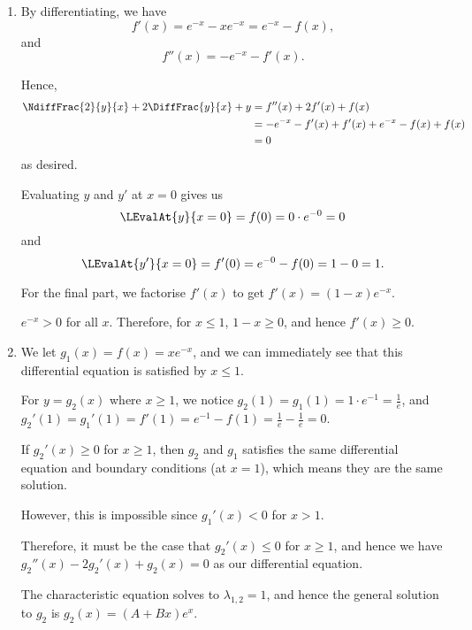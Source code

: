 \Question{\currfilebase}

\begin{enumerate}
    \item By differentiating, we have
          \[
              f'(x) = e^{-x} - x e^{-x} = e^{-x} - f(x),
          \]
          and
          \[
              f''(x) = -e^{-x} - f'(x).
          \]

          Hence,
          \begin{align*}
              \NdiffFrac{2}{y}{x} + 2 \DiffFrac{y}{x} + y & = f''(x) + 2f'(x) + f(x)                         \\
                                                          & = -e^{-x} - f'(x) + f'(x) + e^{-x} - f(x) + f(x) \\
                                                          & = 0
          \end{align*}
          as desired.

          Evaluating \(y\) and \(y'\) at \(x = 0\) gives us
          \[
              \LEvalAt{y}{x = 0} = f(0) = 0 \cdot e^{-0} = 0
          \]
          and
          \[
              \LEvalAt{y'}{x = 0} = f'(0) = e^{-0} - f(0) = 1 - 0 = 1.
          \]

          For the final part, we factorise \(f'(x)\) to get \(f'(x) = (1 - x) e^{-x}\).

          \(e^{-x} > 0\) for all \(x\). Therefore, for \(x \leq 1\), \(1 - x \geq 0\), and hence \(f'(x) \geq 0\).

    \item We let \(g_1(x) = f(x) = x e^{-x}\), and we can immediately see that this differential equation is satisfied by \(x \leq 1\).

          For \(y = g_2(x)\) where \(x \geq 1\), we notice \(g_2(1) = g_1(1) = 1 \cdot e^{-1} = \frac{1}{e}\), and \(g_2'(1) = g_1'(1) = f'(1) = e^{-1} - f(1) = \frac{1}{e} - \frac{1}{e} = 0\).

          If \(g_2'(x) \geq 0\) for \(x \geq 1\), then \(g_2\) and \(g_1\) satisfies the same differential equation and boundary conditions (at \(x = 1\)), which means they are the same solution.

          However, this is impossible since \(g_1'(x) < 0\) for \(x > 1\).

          Therefore, it must be the case that \(g_2'(x) \leq 0\) for \(x \geq 1\), and hence we have \(g_2''(x) - 2 g_2'(x) + g_2(x) = 0\) as our differential equation.

          The characteristic equation solves to \(\lambda_{1, 2} = 1\), and hence the general solution to \(g_2\) is \(g_2(x) = (A + Bx) e^{x}\).


\end{enumerate}
